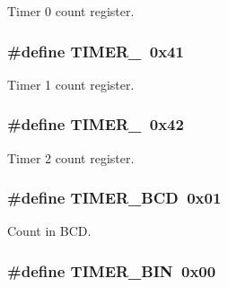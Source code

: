 Timer 0 count register. 

\subsubsection[{\texorpdfstring{T\+I\+M\+E\+R\+\_\+1}{TIMER_1}}]{\setlength{\rightskip}{0pt plus 5cm}\#define T\+I\+M\+E\+R\+\_~0x41}\hypertarget{group__i8254_gac62c99c2a9289891c1b83052242cca49}{}\label{group__i8254_gac62c99c2a9289891c1b83052242cca49}


Timer 1 count register. 

\subsubsection[{\texorpdfstring{T\+I\+M\+E\+R\+\_\+2}{TIMER_2}}]{\setlength{\rightskip}{0pt plus 5cm}\#define T\+I\+M\+E\+R\+\_~0x42}\hypertarget{group__i8254_ga1f34f18ad0ab8cace46b615773b48735}{}\label{group__i8254_ga1f34f18ad0ab8cace46b615773b48735}


Timer 2 count register. 

\subsubsection[{\texorpdfstring{T\+I\+M\+E\+R\+\_\+\+B\+CD}{TIMER_BCD}}]{\setlength{\rightskip}{0pt plus 5cm}\#define T\+I\+M\+E\+R\+\_\+\+B\+CD~0x01}\hypertarget{group__i8254_ga325b992a371d5d981c4eceff42fa5956}{}\label{group__i8254_ga325b992a371d5d981c4eceff42fa5956}


Count in B\+CD. 

\subsubsection[{\texorpdfstring{T\+I\+M\+E\+R\+\_\+\+B\+IN}{TIMER_BIN}}]{\setlength{\rightskip}{0pt plus 5cm}\#define T\+I\+M\+E\+R\+\_\+\+B\+IN~0x00}\hypertarget{group__i8254_gad2913dcf2f91453317bd035589ac0a7d}{}\label{group__i8254_gad2913dcf2f91453317bd035589ac0a7d}


